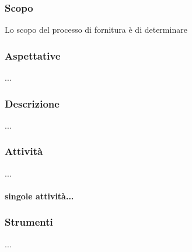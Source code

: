     \subsubsection{Scopo}
    Lo scopo del processo di fornitura è di determinare
    \subsubsection{Aspettative}
    ...
    \subsubsection{Descrizione}
    ...
    \subsubsection{Attività}
    ...
    \paragraph{singole attività...}
    \subsubsection{Strumenti}
    ...